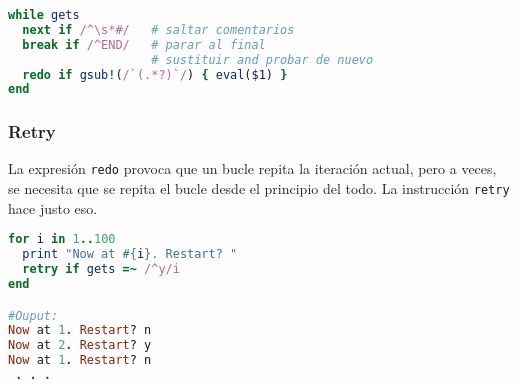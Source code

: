 \begin{lstlisting}[language=Ruby]
while gets
  next if /^\s*#/   # saltar comentarios
  break if /^END/   # parar al final
                    # sustituir and probar de nuevo
  redo if gsub!(/`(.*?)`/) { eval($1) }
end
\end{lstlisting}

\subsubsection{Retry}
La expresión \texttt{redo} provoca que un bucle repita la iteración actual, pero a veces, se necesita que se repita el bucle desde el principio del todo. La instrucción \texttt{retry} hace justo eso.

\begin{lstlisting}[language=Ruby]
for i in 1..100
  print "Now at #{i}. Restart? "
  retry if gets =~ /^y/i
end

#Ouput:
Now at 1. Restart? n
Now at 2. Restart? y
Now at 1. Restart? n
 . . .
\end{lstlisting}